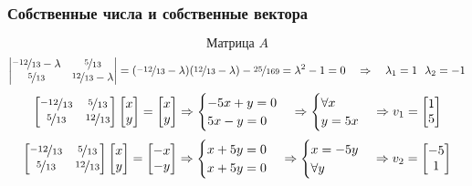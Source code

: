 \documentclass[a3paper,14pt]{extarticle}
\begin{document}
\subsubsection*{\centering Собственные числа и собственные вектора}
$$\text{Матрица } A$$
$$\begin{vmatrix}
    \nicefrac{-12}{13}-\lambda & \nicefrac{5}{13} \\
    \nicefrac{5}{13} & \nicefrac{12}{13}-\lambda
\end{vmatrix} = (\nicefrac{-12}{13}-\lambda)(\nicefrac{12}{13}-\lambda) - \nicefrac{25}{169} = \lambda^2 - 1 = 0 \quad\Rightarrow\quad \lambda_1=1\ \ \lambda_2=-1$$
$$\begin{bmatrix}
    \nicefrac{-12}{13} & \nicefrac{5}{13} \\ \nicefrac{5}{13} & \nicefrac{12}{13}
\end{bmatrix}\begin{bmatrix}
    x \\ y
\end{bmatrix} = \begin{bmatrix}
    x \\ y
\end{bmatrix} \Rightarrow \begin{cases}
    -5x+y=0 \\
    5x-y=0
\end{cases} \Rightarrow \begin{cases}
    \forall x \\
    y = 5x
\end{cases} \Rightarrow v_1 = \begin{bmatrix}
    1 \\ 5
\end{bmatrix}$$
$$\begin{bmatrix}
    \nicefrac{-12}{13} & \nicefrac{5}{13} \\ \nicefrac{5}{13} & \nicefrac{12}{13}
\end{bmatrix}\begin{bmatrix}
    x \\ y
\end{bmatrix} = \begin{bmatrix}
    -x \\ -y
\end{bmatrix} \Rightarrow \begin{cases}
    x+5y=0 \\
    x+5y=0
\end{cases} \Rightarrow \begin{cases}
    x = -5y \\
    \forall y
\end{cases} \Rightarrow v_2 = \begin{bmatrix}
    -5 \\ 1
\end{bmatrix}$$
\end{document}
